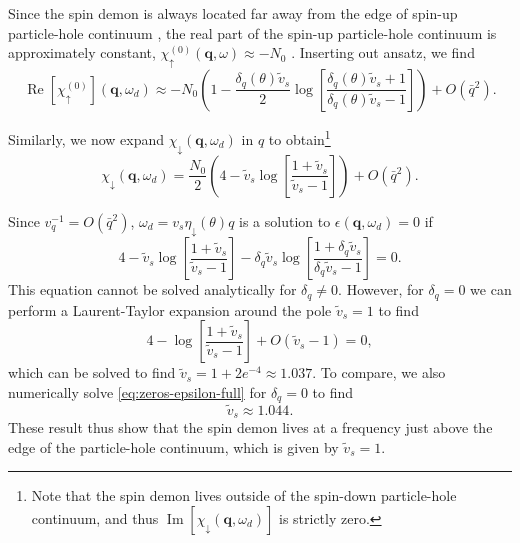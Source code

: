 \documentclass[aps,prb,reprint,twocolumns,superscriptaddress,nofootinbib]{revtex4-2}
\DeclareMathOperator{\Imm}{Im}
\DeclareMathOperator{\Ree}{Re}
\begin{document}
	Since the spin demon is always located far away from the edge of spin-up particle-hole continuum , the real part of the spin-up particle-hole continuum is approximately constant, $\chi_\uparrow^{(0)}(\bm q,\omega)\approx-N_0$ \cite{giulianiQuantumTheoryElectron2005}.
	Inserting out ansatz, we find 
	\begin{equation}
		\Ree[\chi_\uparrow^{(0)}](\bm q,\omega_d) \approx -N_0\left(1-\frac{\delta_q(\theta) \tilde v_s}{2}\log\left[\frac{\delta_q(\theta) \tilde v_s+1}{\delta_q(\theta) \tilde v_s-1}\right]\right) + O\left(\bar q^2\right) \label{eq:chiup-expanded}.
	\end{equation} 
	
	
	
	
	Similarly, we now expand $\chi_\downarrow(\bm q,\omega_d)$ in $q$ to obtain\footnote{Note that the spin demon lives outside of the spin-down particle-hole continuum, and thus $\Imm[\chi_\downarrow(\bm q,\omega_d)]$ is strictly zero.}
	\begin{equation}
		\chi_\downarrow(\bm q,\omega_d) = \frac{N_0}{2}\left(4-\tilde v_s\log \left[ \frac{1+\tilde v_s}{\tilde v_s-1} \right]\right) + O\left(\bar q^2\right) \label{eq:chidown-expanded}.
	\end{equation}
	
	Since $v_q^{-1}=O(\bar q^2)$, $\omega_d=v_s\eta_\downarrow(\theta) q$ is a solution to $\epsilon(\bm q,\omega_d)=0$ if
	\begin{equation}
		4-\tilde v_s\log \left[ \frac{1+\tilde v_s}{\tilde v_s-1}\right] - \delta_q \tilde v_s \log \left[ \frac{1+\delta_q\tilde v_s}{\delta_q\tilde v_s-1}\right] = 0. \label{eq:zeros-epsilon-full}
	\end{equation} 
	This equation cannot be solved analytically for $\delta_q\neq0$. However, for $\delta_q=0$ we can perform a Laurent-Taylor expansion around the pole $\tilde v_s=1$ to find 
	\begin{equation}
		4-\log \left[ \frac{1+\tilde v_s}{\tilde v_s-1}\right] + O(\tilde v_s - 1) = 0,
	\end{equation}
	which can be solved to find $\tilde v_s=1+2e^{-4}\approx1.037$. To compare, we also numerically solve \cref{eq:zeros-epsilon-full} for $\delta_q=0$ to find
	\begin{equation}
		\tilde v_s \approx 1.044.
	\end{equation}
	These result thus show that the spin demon lives at a frequency just above the edge of the particle-hole continuum, which is given by $\tilde v_s=1$.   
	
\end{document}
